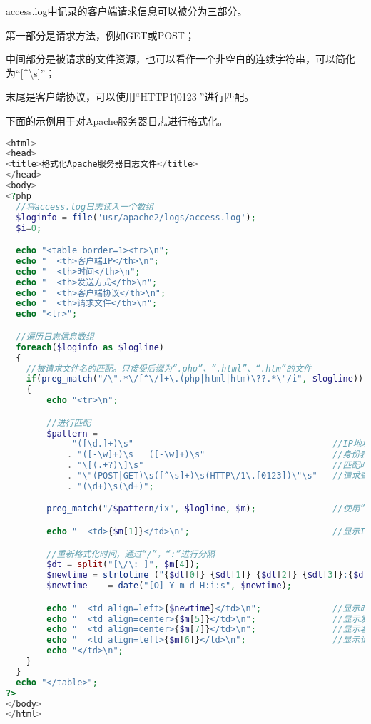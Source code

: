 access.log中记录的客户端请求信息可以被分为三部分。

\begin{compactitem}
\item 第一部分是请求方法，例如GET或POST；
\item 中间部分是被请求的文件资源，也可以看作一个非空白的连续字符串，可以简化为“[\^{}\textbackslash s]”；
\item 末尾是客户端协议，可以使用“HTTP\/1\.[0123]”进行匹配。
\end{compactitem}

下面的示例用于对Apache服务器日志进行格式化。




\begin{lstlisting}[language=PHP]
<html> 
<head>
<title>格式化Apache服务器日志文件</title>
</head>
<body>
<?php
  //将access.log日志读入一个数组
  $loginfo = file('usr/apache2/logs/access.log');
  $i=0;

  echo "<table border=1><tr>\n";
  echo "  <th>客户端IP</th>\n";
  echo "  <th>时间</th>\n";
  echo "  <th>发送方式</th>\n";
  echo "  <th>客户端协议</th>\n";
  echo "  <th>请求文件</th>\n";
  echo "<tr>";	

  //遍历日志信息数组
  foreach($loginfo as $logline)
  {
	//被请求文件名的匹配。只接受后缀为“.php”、“.html”、“.htm”的文件
	if(preg_match("/\".*\/[^\/]+\.(php|html|htm)\??.*\"/i", $logline))
	{
		echo "<tr>\n";

		//进行匹配
		$pattern =
			 "([\d.]+)\s"										//IP地址
			. "([-\w]+)\s	([-\w]+)\s"							//身份表识
			. "\[(.+?)\]\s" 									//匹配时间
			. "\"(POST|GET)\s([^\s]+)\s(HTTP\/1\.[0123])\"\s"	//请求查询信息
			. "(\d+)\s(\d+)";

		preg_match("/$pattern/ix", $logline, $m);				//使用“x”表示忽略空白

		echo "  <td>{$m[1]}</td>\n";							//显示IP地址

		//重新格式化时间，通过“/”，“:”进行分隔
		$dt = split("[\/\: ]", $m[4]);
		$newtime = strtotime ("{$dt[0]} {$dt[1]} {$dt[2]} {$dt[3]}:{$dt[4]}:{$dt[5]} {$dt[6]}");
		$newtime    = date("[O] Y-m-d H:i:s", $newtime);

		echo "  <td align=left>{$newtime}</td>\n";				//显示时间
		echo "  <td align=center>{$m[5]}</td>\n";				//显示发送方式
		echo "  <td align=center>{$m[7]}</td>\n";				//显示客户端协议
		echo "  <td align=left>{$m[6]}</td>\n";					//显示请求文件
		echo "</td>\n";
	}
  }
  echo "</table>";
?>
</body>
</html>
\end{lstlisting}




